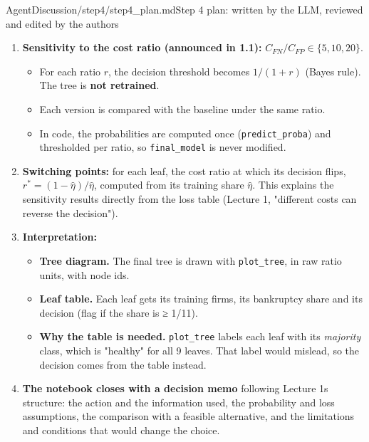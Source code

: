 \begin{mdfile}{AgentDiscussion/\allowbreak{}step4/\allowbreak{}step4\_plan.md}{Step 4 plan: written by the LLM, reviewed and edited by the authors}
\begin{enumerate}
  \begin{itemize}
  \tightlist
  \item
    The loss lies in {[}0, 10{]} and there are 1,364 test firms. Hoeffding then gives a margin of \textbf{±0.37} at 95\%. That is larger than the gap we want to measure (≈ 0.32 vs ≈ 0.15), so the bound is valid but uninformative (Lecture 2: "bounds larger than the loss range are valid but uninformative"). It is shown in one line.
  \item
    Instead: a \textbf{95\% percentile bootstrap} with 1,000 resamples of the test firms, keeping the predictions fixed. The interval is computed for the model\textquotesingle s cost, the baseline\textquotesingle s cost and their \textbf{paired difference}.
  \end{itemize}
\item
  \textbf{Sensitivity to the cost ratio (announced in 1.1):} \(C_{FN}/C_{FP} \in \{5, 10, 20\}\).

  \begin{itemize}
  \tightlist
  \item
    For each ratio \(r\), the decision threshold becomes \(1/(1+r)\) (Bayes rule). The tree is \textbf{not retrained}.
  \item
    Each version is compared with the baseline under the same ratio.
  \item
    In code, the probabilities are computed once (\texttt{predict\_proba}) and thresholded per ratio, so \texttt{final\_model} is never modified.
  \end{itemize}
\item
  \textbf{Switching points:} for each leaf, the cost ratio at which its decision flips, \(r^* = (1-\hat\eta)/\hat\eta\), computed from its training share \(\hat\eta\). This explains the sensitivity results directly from the loss table (Lecture 1, "different costs can reverse the decision").
\item
  \textbf{Interpretation:}

  \begin{itemize}
  \tightlist
  \item
    \textbf{Tree diagram.} The final tree is drawn with \texttt{plot\_tree}, in raw ratio units, with node ids.
  \item
    \textbf{Leaf table.} Each leaf gets its training firms, its bankruptcy share and its decision (flag if the share is ≥ 1/11).
  \item
    \textbf{Why the table is needed.} \texttt{plot\_tree} labels each leaf with its \emph{majority} class, which is "healthy" for all 9 leaves. That label would mislead, so the decision comes from the table instead.
  \end{itemize}
\item
  \textbf{The notebook closes with a decision memo} following Lecture 1\textquotesingle s structure: the action and the information used, the probability and loss assumptions, the comparison with a feasible alternative, and the limitations and conditions that would change the choice.
\end{enumerate}


\end{mdfile}
